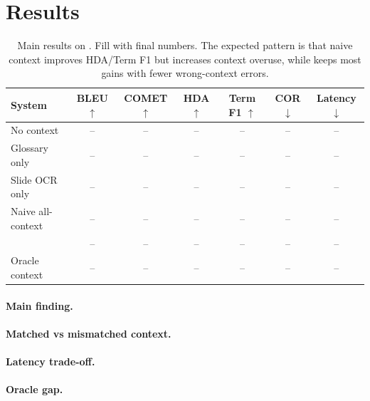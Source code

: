 \section{Results}

\begin{table}[t]
\centering
\small
\begin{tabular}{lcccccc}
\toprule
System & BLEU $\uparrow$ & COMET $\uparrow$ & HDA $\uparrow$ & Term F1 $\uparrow$ & COR $\downarrow$ & Latency $\downarrow$ \\
\midrule
No context & -- & -- & -- & -- & -- & -- \\
Glossary only & -- & -- & -- & -- & -- & -- \\
Slide OCR only & -- & -- & -- & -- & -- & -- \\
Naive all-context & -- & -- & -- & -- & -- & -- \\
\policyname{} & -- & -- & -- & -- & -- & -- \\
Oracle context & -- & -- & -- & -- & -- & -- \\
\bottomrule
\end{tabular}
\caption{Main results on \datasetname.  Fill with final numbers.  The expected pattern is that naive context improves HDA/Term F1 but increases context overuse, while \policyname{} keeps most gains with fewer wrong-context errors.}
\label{tab:main-results}
\end{table}

\paragraph{Main finding.}

\paragraph{Matched vs mismatched context.}

\paragraph{Latency trade-off.}

\paragraph{Oracle gap.}
